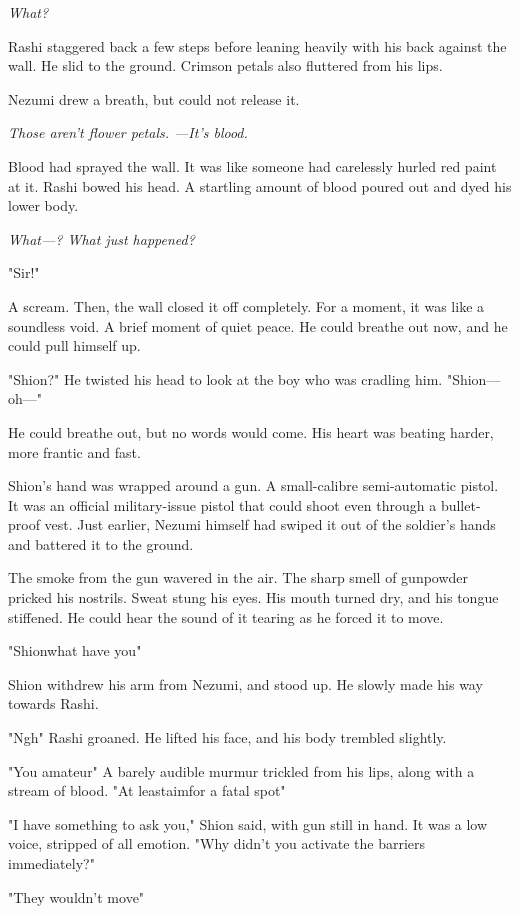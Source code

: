 \emph{What\el ?}

Rashi staggered back a few steps before leaning heavily with his back
against the wall. He slid to the ground. Crimson petals also fluttered
from his lips.

Nezumi drew a breath, but could not release it.

\emph{Those aren't flower petals. ---It's blood.}

Blood had sprayed the wall. It was like someone had carelessly hurled
red paint at it. Rashi bowed his head. A startling amount of blood
poured out and dyed his lower body.

\emph{What---? What just happened?}

"Sir!"

A scream. Then, the wall closed it off completely. For a moment, it was
like a soundless void. A brief moment of quiet peace. He could breathe
out now, and he could pull himself up.

"\el Shion?" He twisted his head to look at the boy who was cradling him.
"Shion---oh---"

He could breathe out, but no words would come. His heart was beating
harder, more frantic and fast.

Shion's hand was wrapped around a gun. A small-calibre semi-automatic
pistol. It was an official military-issue pistol that could shoot even
through a bullet-proof vest. Just earlier, Nezumi himself had swiped it
out of the soldier's hands and battered it to the ground.

The smoke from the gun wavered in the air. The sharp smell of gunpowder
pricked his nostrils. Sweat stung his eyes. His mouth turned dry, and
his tongue stiffened. He could hear the sound of it tearing as he forced
it to move.

"Shion\el what have you\el "

Shion withdrew his arm from Nezumi, and stood up. He slowly made his way
towards Rashi.

"Ngh\el " Rashi groaned. He lifted his face, and his body trembled
slightly.

"\el You amateur\el " A barely audible murmur trickled from his lips,
along with a stream of blood. "At least\el aim\el for a fatal spot\el "

"I have something to ask you," Shion said, with gun still in hand. It
was a low voice, stripped of all emotion. "Why didn't you activate the
barriers immediately?"

"\el They wouldn't move\el "

